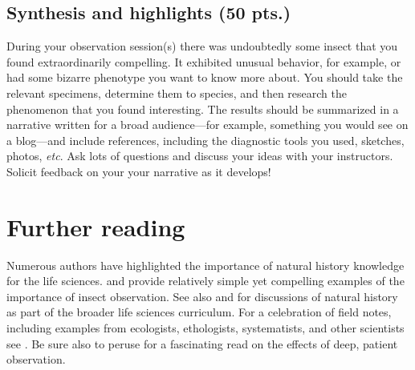 \documentclass[letterpaper, 11pt]{article}
\begin{document}
\subsection*{Synthesis and highlights (50 pts.)}
During your observation session(s) there was undoubtedly some insect that you found extraordinarily compelling. It exhibited unusual behavior, for example, or had some bizarre phenotype you want to know more about. You should take the relevant specimens, determine them to species, and then research the phenomenon that you found interesting. The results should be summarized in a narrative written for a broad audience---for example, something you would see on a blog---and include references, including the diagnostic tools you used, sketches, photos, \textit{etc}. Ask lots of questions and discuss your ideas with your instructors. Solicit feedback on your your narrative as it develops!

\section*{Further reading}
Numerous authors have highlighted the importance of natural history knowledge for the life sciences. \cite{agrawal2014} and \cite{wilcoveeisner2000} provide relatively simple yet compelling examples of the importance of insect observation. See also \cite{Schmidly449} and \cite{Barrows13042016} for discussions of natural history as part of the broader life sciences curriculum. For a celebration of field notes, including examples from ecologists, ethologists, systematists, and other scientists see \cite{canfield2011field}. Be sure also to peruse \cite{roberts2013} for a fascinating read on the effects of deep, patient observation.



\end{document}
